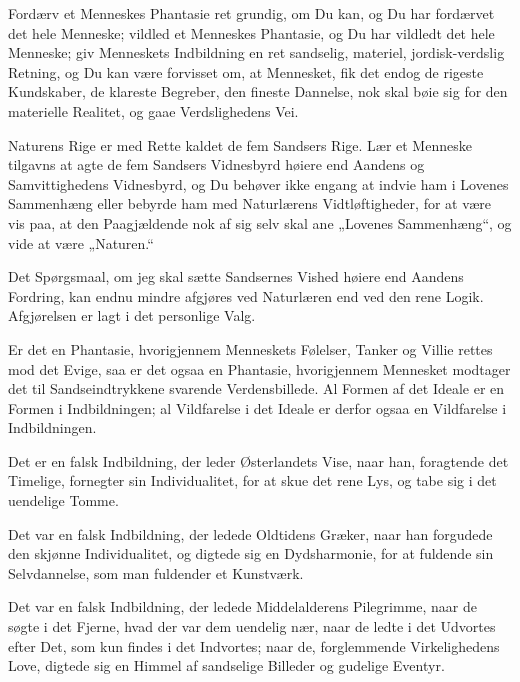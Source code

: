 \documentclass[12pt,a4paper]{book}
\newcommand{\apage}[1]{\marginnote{\footnotesize\textit{[#1]}}}
\begin{document}
Fordærv et Menneskes Phantasie ret grundig, om Du kan, og Du har
fordærvet det hele Menneske; vildled et Menneskes Phantasie, og Du
har vildledt det hele Menneske; giv Menneskets Indbildning en ret
sandselig, materiel, jordisk-verdslig Retning, og Du kan være
forvisset om, at Mennesket, fik det endog de rigeste Kundskaber, de
klareste Begreber, den fineste Dannelse, nok skal bøie sig for den
materielle Realitet, og gaae Verdslighedens \apage{135} Vei.

Naturens Rige er med Rette kaldet de fem Sandsers Rige. Lær et
Menneske tilgavns at agte de fem Sandsers Vidnesbyrd høiere end
Aandens og Samvittighedens Vidnesbyrd, og Du behøver ikke engang
at indvie ham i Lovenes Sammenhæng eller bebyrde ham med
Naturlærens Vidtløftigheder, for at være vis paa, at den
Paagjældende nok af sig selv skal ane „Lovenes Sammenhæng“, og
vide at være „Naturen.“

Det Spørgsmaal, om jeg skal sætte Sandsernes Vished høiere end
Aandens Fordring, kan endnu mindre afgjøres ved Naturlæren end
ved den rene Logik. Afgjørelsen er lagt i det personlige Valg.

Er det en Phantasie, hvorigjennem Menneskets Følelser, Tanker og
Villie rettes mod det Evige, saa er det ogsaa en Phantasie,
hvorigjennem Mennesket modtager det til Sandseindtrykkene
svarende Verdensbillede. Al Formen af det Ideale er en Formen i
Indbildningen; al Vildfarelse i det Ideale er derfor ogsaa en
Vildfarelse i Indbildningen.

Det er en falsk Indbildning, der leder Østerlandets Vise, naar han,
foragtende det Timelige, fornegter sin Individualitet, for at skue det
rene Lys, og tabe sig i det uendelige Tomme.

Det var en falsk Indbildning, der ledede Oldtidens Græker, naar han
forgudede den skjønne Individualitet, og digtede sig en
Dydsharmonie, for at fuldende sin Selvdannelse, som man fuldender
et Kunstværk.

Det var en falsk Indbildning, der ledede Middelalderens
Pilegrimme, naar de søgte i det Fjerne, hvad der var dem uendelig
nær, naar de ledte i det Udvortes efter Det, som kun findes i det
Indvortes; naar de, forglemmende Virkelighedens Love, digtede sig
en Himmel af sandselige Billeder og gudelige Eventyr.
\end{document}
